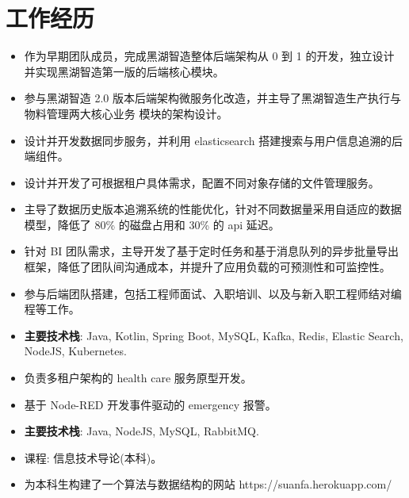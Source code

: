 \documentclass{resume}
\begin{document}


\section{工作经历}
\begin{itemize}
  \item 作为早期团队成员，完成黑湖智造整体后端架构从 0 到 1 的开发，独立设计并实现黑湖智造第一版的后端核心模块。
  \item 参与黑湖智造 2.0 版本后端架构微服务化改造，并主导了黑湖智造生产执行与物料管理两大核心业务 模块的架构设计。
  \item 设计并开发数据同步服务，并利用 elasticsearch 搭建搜索与用户信息追溯的后端组件。
  \item 设计并开发了可根据租户具体需求，配置不同对象存储的文件管理服务。
  \item 主导了数据历史版本追溯系统的性能优化，针对不同数据量采用自适应的数据模型，降低了 80\% 的磁盘占用和 30\% 的 api 延迟。
  \item 针对 BI 团队需求，主导开发了基于定时任务和基于消息队列的异步批量导出框架，降低了团队间沟通成本，并提升了应用负载的可预测性和可监控性。
  \item 参与后端团队搭建，包括工程师面试、入职培训、以及与新入职工程师结对编程等工作。
  \item \textbf{主要技术栈}: Java, Kotlin, Spring Boot, MySQL, Kafka, Redis, Elastic Search, NodeJS, Kubernetes.
\end{itemize}

\begin{itemize}
  \item 负责多租户架构的 health care 服务原型开发。
  \item 基于 Node-RED 开发事件驱动的 emergency 报警。
  \item \textbf{主要技术栈}: Java, NodeJS, MySQL, RabbitMQ.
\end{itemize}

\begin{itemize}
  \item 课程: 信息技术导论(本科)。
  \item 为本科生构建了一个算法与数据结构的网站 https://suanfa.herokuapp.com/
\end{itemize}
\end{document}
